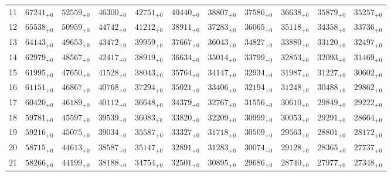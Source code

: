 \documentclass[10pt, a4paper]{article}
\begin{document}
\begin{center}
\begin{tabular}{c || c c c c c | c c c c c}
        \hline
        11 & \({67241}_{+0}\) & \({52559}_{+0}\) & \({46300}_{+0}\) & \({42751}_{+0}\) & \({40440}_{+0}\) & \({38807}_{+0}\) & \({37586}_{+0}\) & \({36638}_{+0}\) & \({35879}_{+0}\) & \({35257}_{+0}\)\\
        12 & \({65538}_{+0}\) & \({50959}_{+0}\) & \({44742}_{+0}\) & \({41212}_{+0}\) & \({38911}_{+0}\) & \({37283}_{+0}\) & \({36065}_{+0}\) & \({35118}_{+0}\) & \({34358}_{+0}\) & \({33736}_{+0}\)\\
        13 & \({64143}_{+0}\) & \({49653}_{+0}\) & \({43472}_{+0}\) & \({39959}_{+0}\) & \({37667}_{+0}\) & \({36043}_{+0}\) & \({34827}_{+0}\) & \({33880}_{+0}\) & \({33120}_{+0}\) & \({32497}_{+0}\)\\
        14 & \({62979}_{+0}\) & \({48567}_{+0}\) & \({42417}_{+0}\) & \({38919}_{+0}\) & \({36634}_{+0}\) & \({35014}_{+0}\) & \({33799}_{+0}\) & \({32853}_{+0}\) & \({32093}_{+0}\) & \({31469}_{+0}\)\\
        15 & \({61995}_{+0}\) & \({47650}_{+0}\) & \({41528}_{+0}\) & \({38043}_{+0}\) & \({35764}_{+0}\) & \({34147}_{+0}\) & \({32934}_{+0}\) & \({31987}_{+0}\) & \({31227}_{+0}\) & \({30602}_{+0}\)\\
        \hline
        16 & \({61151}_{+0}\) & \({46867}_{+0}\) & \({40768}_{+0}\) & \({37294}_{+0}\) & \({35021}_{+0}\) & \({33406}_{+0}\) & \({32194}_{+0}\) & \({31248}_{+0}\) & \({30488}_{+0}\) & \({29862}_{+0}\)\\
        17 & \({60420}_{+0}\) & \({46189}_{+0}\) & \({40112}_{+0}\) & \({36648}_{+0}\) & \({34379}_{+0}\) & \({32767}_{+0}\) & \({31556}_{+0}\) & \({30610}_{+0}\) & \({29849}_{+0}\) & \({29222}_{+0}\)\\
        18 & \({59781}_{+0}\) & \({45597}_{+0}\) & \({39539}_{+0}\) & \({36083}_{+0}\) & \({33820}_{+0}\) & \({32209}_{+0}\) & \({30999}_{+0}\) & \({30053}_{+0}\) & \({29291}_{+0}\) & \({28664}_{+0}\)\\
        19 & \({59216}_{+0}\) & \({45075}_{+0}\) & \({39034}_{+0}\) & \({35587}_{+0}\) & \({33327}_{+0}\) & \({31718}_{+0}\) & \({30509}_{+0}\) & \({29563}_{+0}\) & \({28801}_{+0}\) & \({28172}_{+0}\)\\
        20 & \({58715}_{+0}\) & \({44613}_{+0}\) & \({38587}_{+0}\) & \({35147}_{+0}\) & \({32891}_{+0}\) & \({31283}_{+0}\) & \({30074}_{+0}\) & \({29128}_{+0}\) & \({28365}_{+0}\) & \({27737}_{+0}\)\\
        \hline
        21 & \({58266}_{+0}\) & \({44199}_{+0}\) & \({38188}_{+0}\) & \({34754}_{+0}\) & \({32501}_{+0}\) & \({30895}_{+0}\) & \({29686}_{+0}\) & \({28740}_{+0}\) & \({27977}_{+0}\) & \({27348}_{+0}\)\\

\end{tabular}
\end{center}
\end{document}
